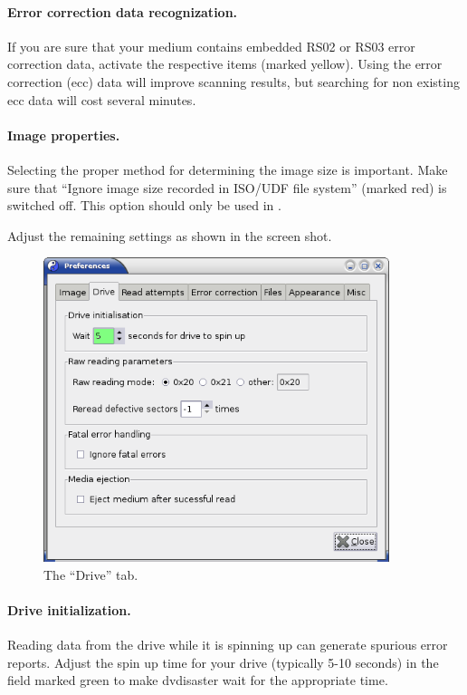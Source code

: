\paragraph{Error correction data recognization.} If you
are sure that your medium contains embedded RS02 or RS03 error
correction data, activate the respective items (marked yellow).
Using the error correction (ecc) data will improve scanning results,
but searching for non existing ecc data will cost several minutes.

\paragraph{Image properties.} Selecting the proper
method for determining the image size is important.
Make sure that ``Ignore image size recorded in ISO/UDF file system''
(marked red) is switched off.
This option should only be used
in .

\smallskip

Adjust the remaining settings as shown in the screen shot.

\newpage

\begin{figure}[h]
\centerline{\includegraphics[width=0.9\textwidth]{screenshots/scan-prefs-drive.png}}
\caption{The ``Drive'' tab.}  
\label{howto-scan-prefs-drive}
\end{figure}

\paragraph{Drive initialization.} Reading data
from the drive while it is spinning up can generate spurious error
reports. Adjust the spin up time for your drive (typically 5-10 seconds)
in the field marked green to make dvdisaster wait for the appropriate time.

